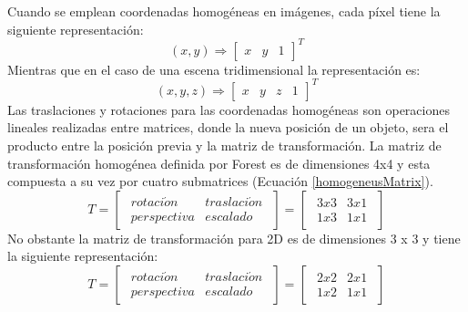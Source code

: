 Cuando se emplean coordenadas homogéneas en imágenes, cada píxel tiene la siguiente representación:
\begin{equation}
(x, y) \Rightarrow
\begin{bmatrix}
x & y & 1
\end{bmatrix}^{T}
\end{equation}
Mientras que en el caso de una escena tridimensional la representación es:
\begin{equation}
(x, y, z) \Rightarrow
\begin{bmatrix}
x & y & z & 1
\end{bmatrix}^{T}
\end{equation}
Las traslaciones y rotaciones para las coordenadas homogéneas son operaciones lineales realizadas entre matrices, donde la nueva posición de un objeto, sera el producto entre la posición previa y la matriz de transformación. La matriz de transformación homogénea definida por Forest es de dimensiones 4x4 y esta compuesta a su vez por cuatro submatrices (Ecuación \ref{homogeneusMatrix}).
\begin{equation}
    T = \begin{bmatrix}
        \begin{array}{c|c}
                rotaci\acute{o}n & traslaci\acute{o}n\\
                \hline
                perspectiva & escalado
        \end{array}
        \end{bmatrix}
        =
        \begin{bmatrix}
        \begin{array}{c|c}
                3 x 3 & 3 x 1\\
                \hline
                1 x 3 & 1 x 1
        \end{array}
        \end{bmatrix}
\label{homogeneusMatrix}
\end{equation}
No obstante la matriz de transformación para 2D es de dimensiones 3 x 3 y tiene la siguiente representación:
\begin{equation}
    T = \begin{bmatrix}
        \begin{array}{c|c}
                rotaci\acute{o}n & traslaci\acute{o}n\\
                \hline
                perspectiva & escalado
        \end{array}
        \end{bmatrix}
        =
        \begin{bmatrix}
        \begin{array}{c|c}
                2 x 2 & 2 x 1\\
                \hline
                1 x 2 & 1 x 1
        \end{array}
        \end{bmatrix}
\end{equation}
